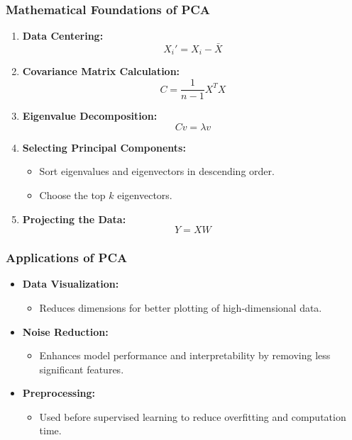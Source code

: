 \documentclass[aspectratio=169]{beamer}
\begin{document}
\begin{frame}[fragile]
    \frametitle{Mathematical Foundations of PCA}
    \begin{enumerate}
        \item \textbf{Data Centering:}
        \begin{equation}
            X_i' = X_i - \bar{X}
        \end{equation}
        
        \item \textbf{Covariance Matrix Calculation:}
        \begin{equation}
            C = \frac{1}{n-1} X^T X
        \end{equation}
        
        \item \textbf{Eigenvalue Decomposition:}
        \begin{equation}
            Cv = \lambda v
        \end{equation}
        
        \item \textbf{Selecting Principal Components:}
        \begin{itemize}
            \item Sort eigenvalues and eigenvectors in descending order.
            \item Choose the top \(k\) eigenvectors.
        \end{itemize}

        \item \textbf{Projecting the Data:}
        \begin{equation}
            Y = X W
        \end{equation}
    \end{enumerate}
\end{frame}

\begin{frame}[fragile]
    \frametitle{Applications of PCA}
    \begin{itemize}
        \item \textbf{Data Visualization:} 
        \begin{itemize}
            \item Reduces dimensions for better plotting of high-dimensional data.
        \end{itemize}
        
        \item \textbf{Noise Reduction:}
        \begin{itemize}
            \item Enhances model performance and interpretability by removing less significant features. 
        \end{itemize}
        
        \item \textbf{Preprocessing:}
        \begin{itemize}
            \item Used before supervised learning to reduce overfitting and computation time.
        \end{itemize}
    \end{itemize}
\end{frame}
\end{document}
